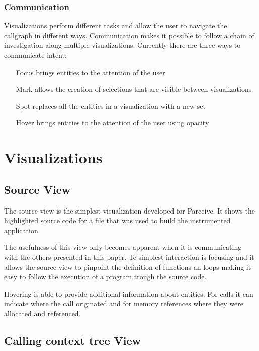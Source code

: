 \documentclass[conference]{IEEEtran}
\begin{document}
\subsubsection{Communication}

Visualizations perform different tasks and allow the user to navigate the callgraph in different ways. Communication makes it possible to follow a chain of investigation along multiple visualizations. Currently there are three ways to communicate intent:

\begin{itemize}
	\item[Focus] brings entities to the attention of the user
	\item[Mark] allows the creation of selections that are visible between visualizations
	\item[Spot] replaces all the entities in a visualization with a new set
	\item[Hover] brings entities to the attention of the user using opacity
\end{itemize}


\section{Visualizations}

\subsection{Source View}

The source view is the simplest visualization developed for Parceive. It shows the highlighted source code for a file that was used to build the instrumented application.

The usefulness of this view only becomes apparent when it is communicating with the others presented in this paper. Te simplest interaction is focusing and it allows the source view to pinpoint the definition of functions an loops making it easy to follow the execution of a program trough the source code.

Hovering is able to provide additional information about entities. For calls it can indicate where the call originated and for memory references where they were allocated and referenced.

\subsection{Calling context tree View}
\end{document}
